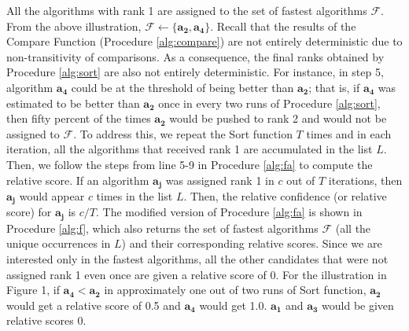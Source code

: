 \documentclass[conference]{IEEEtran}
\begin{document}
All the algorithms with rank 1 are assigned to the set of fastest algorithms $\mathcal{F}$. From the above illustration,
$\mathcal{F} \leftarrow \{\mathbf{a_2}, \mathbf{a_4}\}$. Recall that the results of the Compare Function (Procedure \ref{alg:compare}) are not entirely deterministic due to non-transitivity of comparisons. As a consequence, the final ranks obtained by Procedure \ref{alg:sort} are also not entirely deterministic.
For instance, in step 5, algorithm $\mathbf{a_4}$ could be at the threshold  of being better than $\mathbf{a_2}$; that is, if $\mathbf{a_4}$ was
estimated to be better than $\mathbf{a_2}$ once in every two runs of Procedure \ref{alg:sort}, then fifty percent of the times
$\mathbf{a_2}$ would be pushed to rank 2 and would not be assigned to $\mathcal{F}$. To address this, we repeat the Sort function 
$T$ times and in each iteration, all the algorithms that received rank 1 are accumulated in the list $L$. Then, we follow the steps from line 5-9 in Procedure \ref{alg:fa} to compute the relative score. If an
algorithm $\mathbf{a_j}$ was assigned rank 1 in $c$ out of $T$ iterations, then $\mathbf{a_j}$ would appear $c$ times in
the list $L$. Then, the relative confidence (or relative score) for $\mathbf{a_j}$ is $c/T$. 
The modified version of Procedure \ref{alg:fa} is shown in Procedure \ref{alg:f}, which also returns the set of fastest algorithms $\mathcal{F}$ (all the unique occurrences in $L$)
and their corresponding relative scores. Since we are interested only in the fastest algorithms, all the other
candidates that were not assigned rank 1 even once are given a relative score of 0. For the illustration in Figure 1, if $\mathbf{a_4} < \mathbf{a_2}$ in approximately one out of two runs of Sort function, $\mathbf{a_2}$ would get a relative score of 0.5 and $\mathbf{a_4}$ would get 1.0.  $\mathbf{a_1}$ and $\mathbf{a_3}$ would be given relative scores 0.
\end{document}
